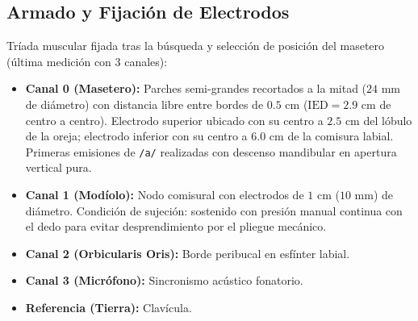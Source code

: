 \documentclass[11pt,a4paper]{article}
\begin{document}
\subsection{Armado y Fijación de Electrodos}
Tríada muscular fijada tras la búsqueda y selección de posición del masetero (última medición con 3 canales):
\begin{itemize}
    \item \textbf{Canal 0 (Masetero):} Parches semi-grandes recortados a la mitad ($24\text{ mm}$ de diámetro) con distancia libre entre bordes de $0.5\text{ cm}$ ($\text{IED} = 2.9\text{ cm}$ de centro a centro). Electrodo superior ubicado con su centro a $2.5\text{ cm}$ del lóbulo de la oreja; electrodo inferior con su centro a $6.0\text{ cm}$ de la comisura labial. Primeras emisiones de \texttt{/a/} realizadas con descenso mandibular en apertura vertical pura.
    \item \textbf{Canal 1 (Modíolo):} Nodo comisural con electrodos de $1\text{ cm}$ ($10\text{ mm}$) de diámetro. Condición de sujeción: sostenido con presión manual continua con el dedo para evitar desprendimiento por el pliegue mecánico.
    \item \textbf{Canal 2 (Orbicularis Oris):} Borde peribucal en esfínter labial.
    \item \textbf{Canal 3 (Micrófono):} Sincronismo acústico fonatorio.
    \item \textbf{Referencia (Tierra):} Clavícula.
\end{itemize}

\newpage
\end{document}
